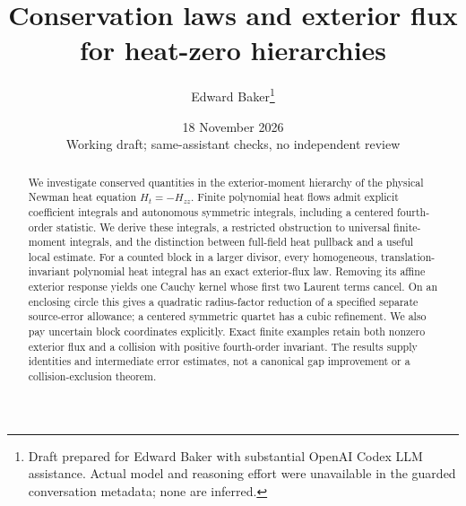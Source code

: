 \documentclass[11pt]{article}
\title{Conservation laws and exterior flux\protect\\for heat-zero hierarchies}
\author{Edward Baker\thanks{Draft prepared for Edward Baker with substantial OpenAI Codex LLM assistance. Actual model and reasoning effort were unavailable in the guarded conversation metadata; none are inferred.}}
\date{18 November 2026\\\small Working draft; same-assistant checks, no independent review}
\theoremstyle{remark}
\numberwithin{equation}{section}
\begin{document}
\maketitle
\begin{abstract}
We investigate conserved quantities in the exterior-moment hierarchy of
the physical Newman heat equation $H_t=-H_{zz}$. Finite polynomial heat
flows admit explicit coefficient integrals and autonomous symmetric
integrals, including a centered fourth-order statistic. We derive these
integrals, a restricted obstruction to universal finite-moment integrals,
and the distinction between full-field heat pullback and a useful local
estimate. For a counted block in a larger divisor, every homogeneous,
translation-invariant polynomial heat integral has an exact exterior-flux
law. Removing its affine exterior response yields one Cauchy kernel whose
first two Laurent terms cancel. On an enclosing circle this gives a
quadratic radius-factor reduction of a specified separate source-error
allowance; a centered symmetric quartet has a cubic refinement. We also
pay uncertain block coordinates explicitly. Exact finite examples retain
both nonzero exterior flux and a collision with positive fourth-order
invariant. The results supply identities and intermediate error estimates,
not a canonical gap improvement or a collision-exclusion theorem.
\end{abstract}
\tableofcontents
\clearpage










\end{document}
